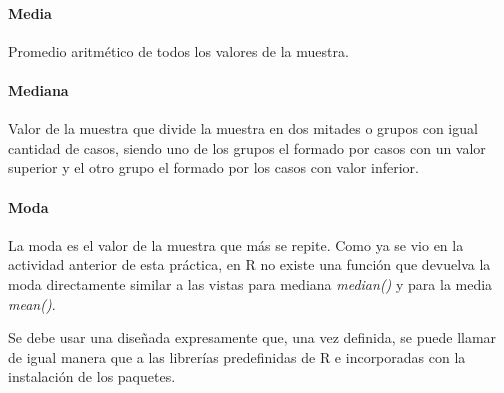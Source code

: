 \documentclass[
  12 pt,
  a4paper,
]{article}
\newenvironment{Shaded}{\begin{snugshade}}{\end{snugshade}}
\newcommand{\AttributeTok}[1]{\textcolor[rgb]{0.13,0.29,0.53}{#1}}
\newcommand{\ConstantTok}[1]{\textcolor[rgb]{0.56,0.35,0.01}{#1}}
\newcommand{\DecValTok}[1]{\textcolor[rgb]{0.00,0.00,0.81}{#1}}
\newcommand{\FunctionTok}[1]{\textcolor[rgb]{0.13,0.29,0.53}{\textbf{#1}}}
\newcommand{\NormalTok}[1]{#1}
\newcommand{\OtherTok}[1]{\textcolor[rgb]{0.56,0.35,0.01}{#1}}
\newcommand{\SpecialCharTok}[1]{\textcolor[rgb]{0.81,0.36,0.00}{\textbf{#1}}}
\begin{document}
\hypertarget{media}{%
\paragraph{Media}\label{media}}

Promedio aritmético de todos los valores de la muestra.

\begin{Shaded}
\end{Shaded}

\hypertarget{mediana}{%
\paragraph{Mediana}\label{mediana}}

Valor de la muestra que divide la muestra en dos mitades o grupos con
igual cantidad de casos, siendo uno de los grupos el formado por casos
con un valor superior y el otro grupo el formado por los casos con valor
inferior.

\begin{Shaded}
\end{Shaded}

\hypertarget{moda}{%
\paragraph{Moda}\label{moda}}

La moda es el valor de la muestra que más se repite. Como ya se vio en
la actividad anterior de esta práctica, en R no existe una función que
devuelva la moda directamente similar a las vistas para mediana
\emph{median()} y para la media \emph{mean()}.

Se debe usar una diseñada expresamente que, una vez definida, se puede
llamar de igual manera que a las librerías predefinidas de R e
incorporadas con la instalación de los paquetes.
\end{document}
